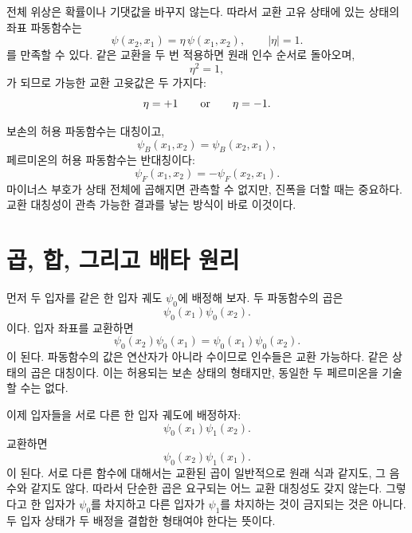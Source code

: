 전체 위상은 확률이나 기댓값을 바꾸지 않는다. 따라서 교환 고유 상태에 있는 상태의 좌표 파동함수는
\begin{equation}
\psi(x_2,x_1)=\eta\,\psi(x_1,x_2),
\qquad
\lvert\eta\rvert=1.
\end{equation}
를 만족할 수 있다. 같은 교환을 두 번 적용하면 원래 인수 순서로 돌아오며,
\begin{equation}
\eta^2=1,
\end{equation}
가 되므로 가능한 교환 고윳값은 두 가지다:
\begin{equation}
\eta=+1
\qquad\hbox{or}\qquad
\eta=-1.
\end{equation}


보손의 허용 파동함수는 대칭이고,
\begin{equation}
\psi_B(x_1,x_2)=\psi_B(x_2,x_1),
\end{equation}
페르미온의 허용 파동함수는 반대칭이다:
\begin{equation}
\psi_F(x_1,x_2)=-\psi_F(x_2,x_1).
\end{equation}
마이너스 부호가 상태 전체에 곱해지면 관측할 수 없지만, 진폭을 더할 때는 중요하다. 교환 대칭성이 관측 가능한 결과를 낳는 방식이 바로 이것이다.

\section{곱, 합, 그리고 배타 원리}

먼저 두 입자를 같은 한 입자 궤도 \(\psi_0\)에 배정해 보자. 두 파동함수의 곱은
\begin{equation}
\psi_0(x_1)\psi_0(x_2).
\end{equation}
이다. 입자 좌표를 교환하면
\begin{equation}
\psi_0(x_2)\psi_0(x_1)
=
\psi_0(x_1)\psi_0(x_2).
\end{equation}
이 된다. 파동함수의 값은 연산자가 아니라 수이므로 인수들은 교환 가능하다. 같은 상태의 곱은 대칭이다. 이는 허용되는 보손 상태의 형태지만, 동일한 두 페르미온을 기술할 수는 없다.

이제 입자들을 서로 다른 한 입자 궤도에 배정하자:
\begin{equation}
\psi_0(x_1)\psi_1(x_2).
\end{equation}
교환하면
\begin{equation}
\psi_0(x_2)\psi_1(x_1).
\end{equation}
이 된다. 서로 다른 함수에 대해서는 교환된 곱이 일반적으로 원래 식과 같지도, 그 음수와 같지도 않다. 따라서 단순한 곱은 요구되는 어느 교환 대칭성도 갖지 않는다. 그렇다고 한 입자가 \(\psi_0\)를 차지하고 다른 입자가 \(\psi_1\)를 차지하는 것이 금지되는 것은 아니다. 두 입자 상태가 두 배정을 결합한 형태여야 한다는 뜻이다.

